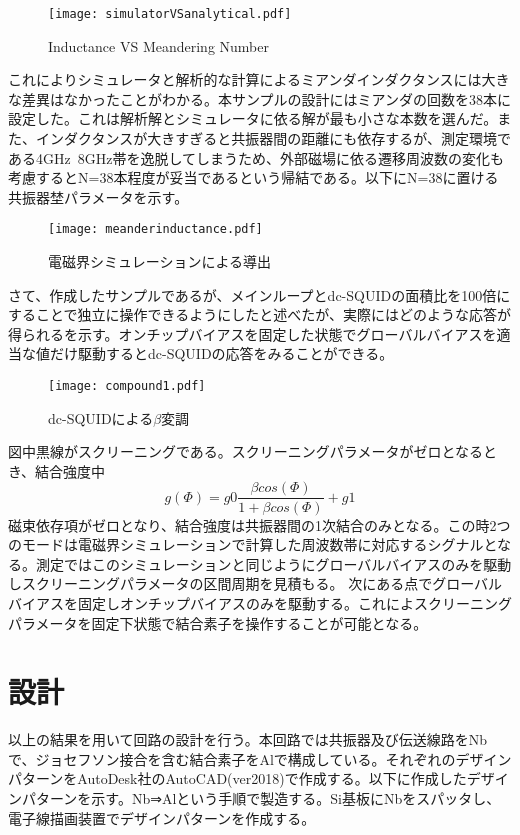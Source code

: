         \begin{figure}[H]
            \centering
            \texttt{[image: simulatorVSanalytical.pdf]}
            \caption{Inductance VS Meandering Number}
        \end{figure}
        これによりシミュレータと解析的な計算によるミアンダインダクタンスには大きな差異はなかったことがわかる。本サンプルの設計にはミアンダの回数を38本に設定した。これは解析解とシミュレータに依る解が最も小さな本数を選んだ。また、インダクタンスが大きすぎると共振器間の距離にも依存するが、測定環境である4GHz~8GHz帯を逸脱してしまうため、外部磁場に依る遷移周波数の変化も考慮するとN=38本程度が妥当であるという帰結である。以下にN=38に置ける共振器埜パラメータを示す。
        \begin{figure}[H]
            \centering
            \texttt{[image: meanderinductance.pdf]}
            \caption{電磁界シミュレーションによる導出}
        \end{figure}
        さて、作成したサンプルであるが、メインループとdc-SQUIDの面積比を100倍にすることで独立に操作できるようにしたと述べたが、実際にはどのような応答が得られるを示す。オンチップバイアスを固定した状態でグローバルバイアスを適当な値だけ駆動するとdc-SQUIDの応答をみることができる。
        \begin{figure}[H]
            \centering
            \texttt{[image: compound1.pdf]}
            \caption{dc-SQUIDによる$\beta$変調}
        \end{figure}
        図中黒線がスクリーニングである。スクリーニングパラメータがゼロとなるとき、結合強度中
        \begin{equation}
            g(\Phi) = g0\frac{\beta cos(\Phi)}{1+\beta cos(\Phi)} + g1
        \end{equation}
        磁束依存項がゼロとなり、結合強度は共振器間の1次結合のみとなる。この時2つのモードは電磁界シミュレーションで計算した周波数帯に対応するシグナルとなる。測定ではこのシミュレーションと同じようにグローバルバイアスのみを駆動しスクリーニングパラメータの区間周期を見積もる。
        次にある点でグローバルバイアスを固定しオンチップバイアスのみを駆動する。これによスクリーニングパラメータを固定下状態で結合素子を操作することが可能となる。

\section{設計}
        以上の結果を用いて回路の設計を行う。本回路では共振器及び伝送線路をNbで、ジョセフソン接合を含む結合素子をAlで構成している。それぞれのデザインパターンをAutoDesk社のAutoCAD(ver2018)で作成する。以下に作成したデザインパターンを示す。Nb⇒Alという手順で製造する。Si基板にNbをスパッタし、電子線描画装置でデザインパターンを作成する。
